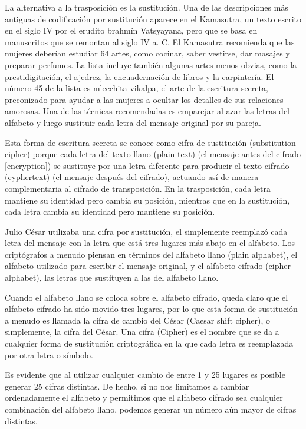 	
	La alternativa a la trasposición es la sustitución. Una de las descripciones más antiguas de codificación por sustitución aparece en el Kamasutra, un texto escrito en el siglo IV por el erudito brahmín Vatsyayana, pero que se basa en manuscritos que se remontan al siglo IV a. C. El Kamasutra recomienda que las mujeres deberían estudiar 64 artes, como cocinar, saber vestirse, dar masajes y preparar perfumes. La lista incluye también algunas artes menos obvias, como la prestidigitación, el ajedrez, la encuadernación de libros y la carpintería. El número 45 de la lista es mlecchita-vikalpa, el arte de la escritura secreta, preconizado para ayudar a las mujeres a ocultar los detalles de sus relaciones amorosas.  Una de las técnicas recomendadas es emparejar al azar las letras del alfabeto y luego sustituir cada letra del mensaje original por su pareja.
	
	
	Esta forma de escritura secreta se conoce como cifra de sustitución (substitution cipher) porque cada
letra del texto llano (plain text) (el mensaje antes del cifrado [encryption]) se sustituye por una letra diferente para producir el texto cifrado (cyphertext) (el mensaje después del cifrado), actuando así de manera complementaria al cifrado de transposición. En la trasposición, cada letra mantiene su identidad pero cambia su posición, mientras que en la sustitución, cada letra cambia su identidad pero mantiene su posición.

	Julio César utilizaba una cifra por sustitución, el simplemente reemplazó cada letra del mensaje con la letra que está tres lugares más abajo en el alfabeto. Los criptógrafos a menudo piensan en términos del alfabeto llano (plain alphabet), el alfabeto utilizado para escribir el mensaje original, y el alfabeto cifrado (cipher alphabet), las letras que sustituyen a las del alfabeto llano.
	
	Cuando el alfabeto llano se coloca sobre el alfabeto cifrado, queda claro que el alfabeto cifrado ha sido movido tres lugares, por lo que esta forma de sustitución a menudo es llamada la cifra de cambio del César (Caesar shift cipher), o simplemente, la cifra del César. Una cifra (Cipher) es el nombre que se da a cualquier forma de sustitución criptográfica en la que cada letra es reemplazada por otra letra o símbolo.
	 
	 Es evidente que al utilizar cualquier cambio de entre 1 y 25 lugares es posible generar 25 cifras distintas. De hecho, si no nos limitamos a cambiar ordenadamente el alfabeto y permitimos que el alfabeto cifrado sea cualquier combinación del alfabeto llano, podemos generar un número aún mayor de cifras distintas.
	 
